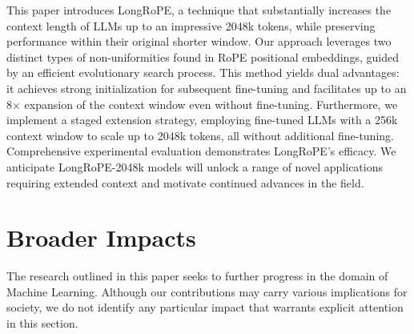 This paper introduces LongRoPE, a technique that substantially increases the context length of LLMs up to an impressive 2048k tokens, while preserving performance within their original shorter window. Our approach leverages two distinct types of non-uniformities found in RoPE positional embeddings, guided by an efficient evolutionary search process. This method yields dual advantages: it achieves strong initialization for subsequent fine-tuning and facilitates up to an 8$\times$ expansion of the context window even without fine-tuning. Furthermore, we implement a staged extension strategy, employing fine-tuned LLMs with a 256k context window to scale up to 2048k tokens, all without additional fine-tuning. Comprehensive experimental evaluation demonstrates LongRoPE’s efficacy. We anticipate LongRoPE-2048k models will unlock a range of novel applications requiring extended context and motivate continued advances in the field.

\section*{Broader Impacts} The research outlined in this paper seeks to further progress in the domain of Machine Learning. Although our contributions may carry various implications for society, we do not identify any particular impact that warrants explicit attention in this section.

	\balance


